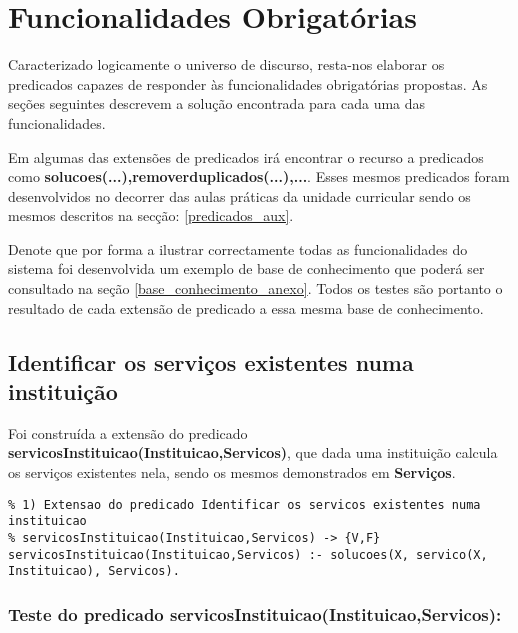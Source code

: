 \documentclass[
  oneside,
  10pt, a4paper,
  footinclude=true,
  headinclude=true,
  cleardoublepage=empty
]{scrbook}
\begin{document}
    \section{Funcionalidades Obrigatórias}
Caracterizado logicamente o universo de discurso, resta-nos elaborar os predicados capazes de responder às funcionalidades obrigatórias propostas. As  seções seguintes descrevem a solução encontrada para cada uma das funcionalidades. \par Em algumas das extensões de predicados irá encontrar o recurso a predicados como \textbf{solucoes(...),removerduplicados(...),...}. Esses mesmos predicados foram desenvolvidos no decorrer das aulas práticas da unidade curricular sendo os mesmos descritos na secção:  \ref{predicados_aux}.\par 
Denote que por forma a ilustrar correctamente todas as funcionalidades do sistema foi desenvolvida um exemplo de base de conhecimento que poderá ser consultado na seção \ref{base_conhecimento_anexo}. Todos os testes são portanto o resultado de cada extensão de predicado a essa mesma base de conhecimento.\par 







\subsection{Identificar os serviços existentes numa instituição}

Foi construída a extensão do predicado \textbf{servicosInstituicao(Instituicao,Servicos)}, que dada uma instituição calcula os serviços existentes nela, sendo os mesmos demonstrados em \textbf{Serviços}.\par 

\begin{lstlisting}
% 1) Extensao do predicado Identificar os servicos existentes numa instituicao
% servicosInstituicao(Instituicao,Servicos) -> {V,F}
servicosInstituicao(Instituicao,Servicos) :- solucoes(X, servico(X, Instituicao), Servicos).
\end{lstlisting}

\subsubsection{Teste do predicado \textbf{servicosInstituicao(Instituicao,Servicos)}:}
\end{document}
